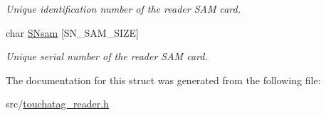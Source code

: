 \begin{DoxyCompactItemize}
\begin{DoxyCompactList}\small\item\em Unique identification number of the reader SAM card. \item\end{DoxyCompactList}\item 
\hypertarget{structreader__s_a8dcaa30f40e769b7bfe6ed9bf5c3f903}{
char \hyperlink{structreader__s_a8dcaa30f40e769b7bfe6ed9bf5c3f903}{SNsam} \mbox{[}SN\_\-SAM\_\-SIZE\mbox{]}}
\label{structreader__s_a8dcaa30f40e769b7bfe6ed9bf5c3f903}

\begin{DoxyCompactList}\small\item\em Unique serial number of the reader SAM card. \item\end{DoxyCompactList}\end{DoxyCompactItemize}


The documentation for this struct was generated from the following file:\begin{DoxyCompactItemize}
\item 
src/\hyperlink{touchatag__reader_8h}{touchatag\_\-reader.h}\end{DoxyCompactItemize}
